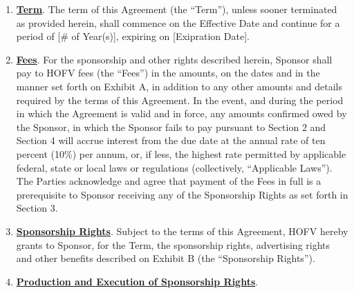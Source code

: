 \documentclass{article}
\begin{document}
\begin{enumerate}
\def\labelenumi{\arabic{enumi}.}
\item
  \textbf{\uline{Term}}. The term of this Agreement (the ``Term''),
  unless sooner terminated as provided herein, shall commence on the
  Effective Date and continue for a period of {[}\# of Year(s){]},
  expiring on {[}Exipration Date{]}.
\item
  \textbf{\uline{Fees}}. For the sponsorship and other rights described
  herein, Sponsor shall pay to HOFV fees (the ``Fees'') in the amounts,
  on the dates and in the manner set forth on Exhibit A, in addition to
  any other amounts and details required by the terms of this Agreement.
  In the event, and during the period in which the Agreement is valid
  and in force, any amounts confirmed owed by the Sponsor, in which the
  Sponsor fails to pay pursuant to Section 2 and Section 4 will accrue
  interest from the due date at the annual rate of ten percent (10\%)
  per annum, or, if less, the highest rate permitted by applicable
  federal, state or local laws or regulations (collectively,
  ``Applicable Laws''). The Parties acknowledge and agree that payment
  of the Fees in full is a prerequisite to Sponsor receiving any of the
  Sponsorship Rights as set forth in Section 3.
\item
  \textbf{\uline{Sponsorship Rights}}. Subject to the terms of this
  Agreement, HOFV hereby grants to Sponsor, for the Term, the
  sponsorship rights, advertising rights and other benefits described on
  Exhibit B (the ``Sponsorship Rights'').
\item
  \textbf{\uline{Production and Execution of Sponsorship Rights}}.


\end{enumerate}
\end{document}
